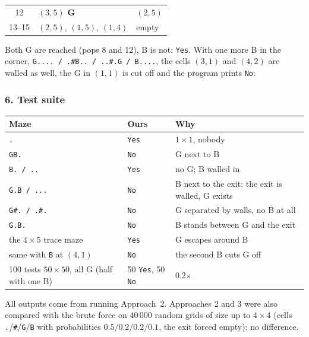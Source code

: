 \begin{tracebox}
\begin{center}
\begin{tabular}{@{}cll@{}}
12 & $(3,5)$ \textbf{G} & $(2,5)$ \\
13--15 & $(2,5)$, $(1,5)$, $(1,4)$ & empty \\
\bottomrule
\end{tabular}
\end{center}
Both G are reached (pops 8 and 12), B is not: \texttt{Yes}. With one more B in the corner, \texttt{G.... / .\#B.. / ..\#.G / B....}, the cells $(3,1)$ and $(4,2)$ are walled as well, the G in $(1,1)$ is cut off and the program prints \texttt{No}:
\begin{center}
\end{center}
\end{tracebox}

\subsubsection*{6. Test suite}

\begin{testbox}
\centering\small
\begin{tabular}{@{}p{4.6cm}lp{6.6cm}@{}}
\toprule
\textbf{Maze} & \textbf{Ours} & \textbf{Why} \\
\midrule
\texttt{.} & \texttt{Yes} & $1 \times 1$, nobody \\
\texttt{GB.} & \texttt{No} & G next to B \\
\texttt{B. / ..} & \texttt{Yes} & no G; B walled in \\
\texttt{G.B / ...} & \texttt{No} & B next to the exit: the exit is walled, G exists \\
\texttt{G\#. / .\#.} & \texttt{No} & G separated by walls, no B at all \\
\texttt{G.B.} & \texttt{No} & B stands between G and the exit \\
the $4 \times 5$ trace maze & \texttt{Yes} & G escapes around B \\
same with \texttt{B} at $(4,1)$ & \texttt{No} & the second B cuts G off \\
100 tests $50 \times 50$, all G (half with one B) & 50 \texttt{Yes}, 50 \texttt{No} & 0.2\,s \\
\bottomrule
\end{tabular}
\end{testbox}
All outputs come from running Approach~2. Approaches 2 and 3 were also compared with the brute force on $40\,000$ random grids of size up to $4 \times 4$ (cells \texttt{.}/\texttt{\#}/\texttt{G}/\texttt{B} with probabilities $0.5/0.2/0.2/0.1$, the exit forced empty): no difference.

